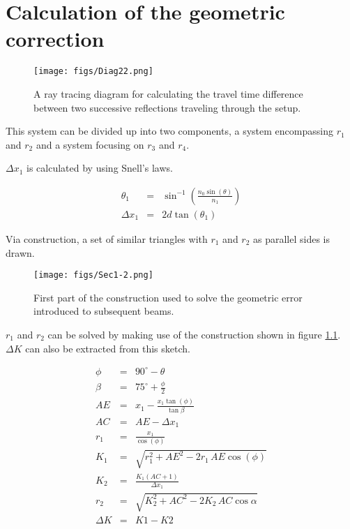 \chapter{Calculation of the geometric correction}
\label{chp:Geom}

\begin{figure}[H]
\begin{center}
\texttt{[image: figs/Diag22.png]}
\end{center}
\caption[Diagram depicting ray-trace of internal reflection compared to surface reflection]{A ray tracing diagram for calculating the travel time difference between two successive reflections traveling through the setup.}
\end{figure}

This system can be divided up into two components, a system encompassing $r_{1}$ and $r_{2}$ and a system focusing on $r_{3}$ and $r_{4}$.

$\Delta x_{1}$ is calculated by using Snell's laws.

\begin{eqnarray}
\theta_{1} &=& \sin^{-1}(\frac{n_{0}\sin(\theta)}{n_{1}})\\
\Delta x_{1} &=& 2d\tan(\theta_{1})
\label{eqn:Geo0}
\end{eqnarray}

Via construction, a set of similar triangles with $r_{1}$ and $r_{2}$ as parallel sides is drawn.

\begin{figure}[H]
\begin{center}
\texttt{[image: figs/Sec1-2.png]}
\end{center}
\caption[First section of the exiting beam path used to calculate a geometric correction for subsequent beams.]{First part of the construction used to solve the geometric error introduced to subsequent beams.}\label{fig:GeoSec-1}
\end{figure}

$r_{1}$ and $r_{2}$ can be solved by making use of the construction shown in figure \ref{fig:GeoSec-1}. $\Delta K$ can also be extracted from this sketch. 

\begin{eqnarray}
\phi &=& 90^{\circ} - \theta\\
\beta &=& 75^{\circ} + \frac{\phi}{2}\\
AE &=& x_{1} - \frac{x_{1}\tan(\phi)}{\tan{\beta}}\\
AC &=& AE - \Delta x_{1}\\
r_{1} &=& \frac{x_{1}}{\cos(\phi)}\\
K_{1} &=& \sqrt{r_{1}^{2} + AE^{2} - 2r_{1}\,AE\cos(\phi)}\\
K_{2} &=& \frac{K_{1}(AC + 1)}{\Delta x_{1}}\\
r_{2} &=& \sqrt{K_{2}^{2} + AC^{2} - 2K_{2}\,AC\cos{\alpha}}\\
\Delta K &=& K1 - K2
\label{eqn:geo1}
\end{eqnarray}

